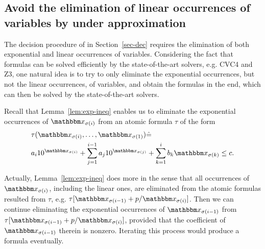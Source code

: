 \subsection{Avoid the elimination of linear occurrences of variables by under approximation}\label{para: opt under appro}

The decision procedure of {\paexp} in Section~\ref{sec-dec} requires the elimination of both exponential and linear occurrences of variables. Considering the fact that {\pa} formulas can be solved efficiently by the state-of-the-art solvers, e.g. CVC4 and Z3, one natural idea is to try to only eliminate the exponential occurrences, but not the linear occurrences, of variables, and obtain the {\pa} formulas in the end, which can then be solved by the state-of-the-art solvers.

Recall that Lemma~\ref{lem:exp-ineq} enables us to eliminate the exponential occurrences of $\ivarx_{\sigma(i)}$ from an atomic formula $\tau$ of the form
\begin{equation}
    \begin{aligned}
        &\tau(\ivarx_{\sigma(i)}, \ldots, \ivarx_{\sigma(1)}) \Def  \\
        &a_i 10^{\ivarx_{\sigma(i)}}+\sum_{j=1}^{i-1} a_j 10^{\ivarx_{\sigma(j)}} + \sum_{k=1}^{i}b_k \ivarx_{\sigma(k)} \le c.
    \end{aligned}            
\end{equation}


Actually, Lemma~\ref{lem:exp-ineq} does more in the sense that all occurrences of $\ivarx_{\sigma(i)}$, including the linear ones, are eliminated from the atomic formulas resulted from $\tau$, e.g. $\tau[\ivarx_{\sigma(i-1)} + p /\ivarx_{\sigma(i)}]$. Then we can continue eliminating the exponential occurrences of $\ivarx_{\sigma(i-1)}$ from $\tau[\ivarx_{\sigma(i-1)} + p /\ivarx_{\sigma(i)}]$, provided that the coefficient of $\ivarx_{\sigma(i-1)}$ therein is nonzero. Iterating this process would produce a {\pa} formula eventually.

